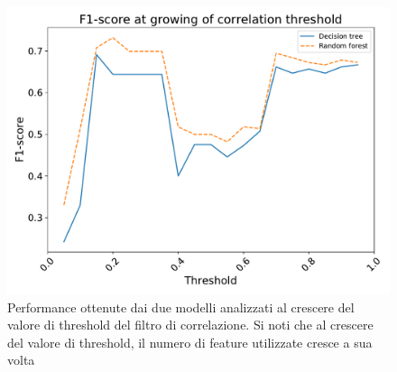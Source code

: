 \begin{figure}
	\centering
	\includegraphics[width=0.7\linewidth]{images/corr-perf}
	\caption{Performance ottenute dai due modelli analizzati al crescere del valore di threshold del filtro di correlazione. Si noti che al crescere del valore di threshold, il numero di feature utilizzate cresce a sua volta}
	\label{fig:corr-perf}
\end{figure}


